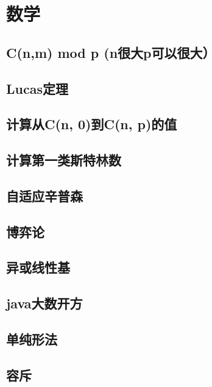 \chapter{数学}
\section{C(n,m) mod p (n很大p可以很大）}
\raggedbottom
\hrulefill
\section{Lucas定理}
\raggedbottom
\hrulefill
\section{计算从C(n, 0)到C(n, p)的值}
\raggedbottom
\hrulefill
\section{计算第一类斯特林数}
\raggedbottom
\hrulefill
\section{自适应辛普森}
\raggedbottom
\hrulefill
\section{博弈论}
\raggedbottom
\hrulefill
\section{异或线性基}
\raggedbottom
\hrulefill
\section{java大数开方}
\raggedbottom
\hrulefill
\section{单纯形法}
\raggedbottom
\hrulefill
\section{容斥}
\raggedbottom
\hrulefill

